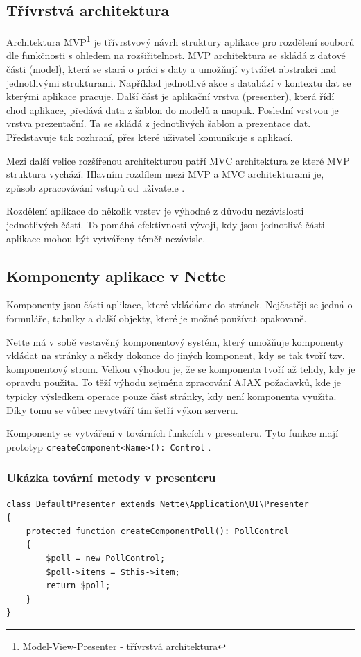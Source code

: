 \documentclass[czech,BP]{thesiskiv}
\begin{document}
		\subsection{Třívrstvá architektura}
		\par Architektura MVP\footnote{Model-View-Presenter - třívrstvá architektura} je třívrstvový návrh struktury aplikace pro rozdělení souborů dle funkčnosti s ohledem na rozšiřitelnost. MVP architektura se skládá z datové části (model), která se stará o práci s daty a umožňují vytvářet abstrakci nad jednotlivými strukturami. Například jednotlivé akce s databází v kontextu dat se kterými aplikace pracuje. Další část je aplikační vrstva (presenter), která řídí chod aplikace, předává data z šablon do modelů a naopak. Poslední vrstvou je vrstva prezentační. Ta se skládá z jednotlivých šablon a prezentace dat. Představuje tak rozhraní, přes které uživatel komunikuje s aplikací.
		\par Mezi další velice rozšířenou architekturou patří MVC architektura ze které MVP struktura vychází. Hlavním rozdílem mezi MVP a MVC architekturami je, způsob zpracovávání vstupů od uživatele \cite{3Vrstvy}.
		\par Rozdělení aplikace do několik vrstev je výhodné z důvodu nezávislosti jednotlivých částí. To pomáhá efektivnosti vývoji, kdy jsou jednotlivé části aplikace mohou být vytvářeny téměř nezávisle.
		
		\subsection{Komponenty aplikace v Nette}
		\par Komponenty jsou části aplikace, které vkládáme do stránek. Nejčastěji se jedná o formuláře, tabulky a další objekty, které je možné používat opakovaně.
		\par Nette má v sobě vestavěný komponentový systém, který umožňuje komponenty vkládat na stránky a někdy dokonce do jiných komponent, kdy se tak tvoří tzv. komponentový strom. Velkou výhodou je, že se komponenta tvoří až tehdy, kdy je opravdu použita. To těží výhodu zejména zpracování AJAX požadavků, kde je typicky výsledkem operace pouze část stránky, kdy není komponenta využita. Díky tomu se vůbec nevytváří tím šetří výkon serveru.
		\par Komponenty se vytváření v továrních funkcích v presenteru. Tyto funkce mají prototyp \texttt{createComponent<Name>(): Control} \cite{NetteComponents}.
		
		\subsubsection{Ukázka tovární metody v presenteru}
		\begin{lstlisting}[caption={Ukázka tovární metody v presenteru}]
class DefaultPresenter extends Nette\Application\UI\Presenter
{
	protected function createComponentPoll(): PollControl
	{
		$poll = new PollControl;
		$poll->items = $this->item;
		return $poll;
	}
}
\end{lstlisting}
		
\end{document}
